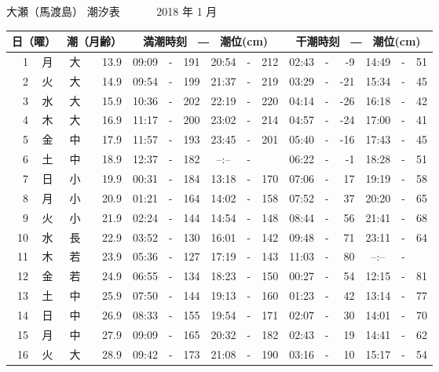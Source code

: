 \documentclass[12pt.a4j]{jsarticle}
\begin{document}
\pagestyle{empty}
 \begin{center}
 {\LARGE 大瀬（馬渡島）  潮汐表　　　}
 {\large 2018 年  1 月}\\
 \begin{table}[ht]
    \begin{tabular}{|rc|cr|ccrccr|ccrccr|}
    \hline
    \multicolumn{2}{|c|}{日（曜）} & \multicolumn{2}{c|}{潮（月齢）} & \multicolumn{6}{c|}{満潮時刻　―　潮位(cm)} & \multicolumn{6}{c|}{干潮時刻　―　潮位(cm)} \\
 \hline
 1 & 月 & 大 & 13.9 &  09:09 &-& 191  &  20:54 &-& 212  &   02:43 &-&  -9  &   14:49 &-&  51  \\
 2 & 火 & 大 & 14.9 &  09:54 &-& 199  &  21:37 &-& 219  &   03:29 &-& -21  &   15:34 &-&  45  \\
 3 & 水 & 大 & 15.9 &  10:36 &-& 202  &  22:19 &-& 220  &   04:14 &-& -26  &   16:18 &-&  42  \\
 4 & 木 & 大 & 16.9 &  11:17 &-& 200  &  23:02 &-& 214  &   04:57 &-& -24  &   17:00 &-&  41  \\
 5 & 金 & 中 & 17.9 &  11:57 &-& 193  &  23:45 &-& 201  &   05:40 &-& -16  &   17:43 &-&  45  \\
 6 & 土 & 中 & 18.9 &  12:37 &-& 182  &  --:-- &-&     &   06:22 &-&  -1  &   18:28 &-&  51  \\
 7 & 日 & 小 & 19.9 &  00:31 &-& 184  &  13:18 &-& 170  &   07:06 &-&  17  &   19:19 &-&  58  \\
 8 & 月 & 小 & 20.9 &  01:21 &-& 164  &  14:02 &-& 158  &   07:52 &-&  37  &   20:20 &-&  65  \\
 9 & 火 & 小 & 21.9 &  02:24 &-& 144  &  14:54 &-& 148  &   08:44 &-&  56  &   21:41 &-&  68  \\
10 & 水 & 長 & 22.9 &  03:52 &-& 130  &  16:01 &-& 142  &   09:48 &-&  71  &   23:11 &-&  64  \\
11 & 木 & 若 & 23.9 &  05:36 &-& 127  &  17:19 &-& 143  &   11:03 &-&  80  &   --:-- &-&     \\
12 & 金 & 若 & 24.9 &  06:55 &-& 134  &  18:23 &-& 150  &   00:27 &-&  54  &   12:15 &-&  81  \\
13 & 土 & 中 & 25.9 &  07:50 &-& 144  &  19:13 &-& 160  &   01:23 &-&  42  &   13:14 &-&  77  \\
14 & 日 & 中 & 26.9 &  08:33 &-& 155  &  19:54 &-& 171  &   02:07 &-&  30  &   14:01 &-&  70  \\
15 & 月 & 中 & 27.9 &  09:09 &-& 165  &  20:32 &-& 182  &   02:43 &-&  19  &   14:41 &-&  62  \\
16 & 火 & 大 & 28.9 &  09:42 &-& 173  &  21:08 &-& 190  &   03:16 &-&  10  &   15:17 &-&  54  \\

\end{tabular}
\end{table}
\end{center}
\end{document}
